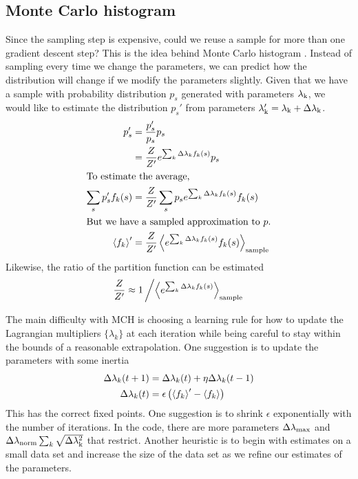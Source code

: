 \documentclass[aps,prl,twocolumn]{revtex4-1}
\begin{document}
\subsection{Monte Carlo histogram}
Since the sampling step is expensive, could we reuse a sample for more than one gradient descent step? This is the idea behind Monte Carlo histogram \cite{Broderick:2007wq}. Instead of sampling every time we change the parameters, we can predict how the distribution will change if we modify the parameters slightly. Given that we have a sample with probability distribution $p_s$ generated with parameters $\lambda_{\rm k}$, we would like to estimate the distribution $p_s'$ from parameters $\lambda_{\rm k}' = \lambda_{\rm k}+\Delta\lambda_{\rm k}$.
\begin{align}
	p_s' &= \frac{p'_s}{p_s}p_s\\
		&= \frac{Z}{Z'}e^{\sum_k \Delta\lambda_k f_k(s)} p_s\\
\intertext{To estimate the average,}
	\sum_s p_s' f_k(s) &= \frac{Z}{Z'} \sum_s p_s e^{\sum_k \Delta\lambda_k f_k(s)} f_k(s)\\
\intertext{But we have a sampled approximation to $p$.}
	\left<f_k\right>' &= \frac{Z}{Z'} \left<e^{\sum_k \Delta\lambda_k f_k(s)} f_k(s)\right>_{\rm sample}
\end{align}
Likewise, the ratio of the partition function can be estimated
\begin{align}
	\frac{Z}{Z'} \approx 1\left/\left<e^{\sum_k \Delta\lambda_k f_k(s)}\right>_{\rm sample}\right.
\end{align}

The main difficulty with MCH is choosing a learning rule for how to update the Lagrangian multipliers $\{\lambda_k\}$ at each iteration while being careful to stay within the bounds of a reasonable extrapolation. One suggestion is to update the parameters with some inertia
\begin{align}
	\Delta\lambda_k(t+1) &= \Delta \lambda_k(t) + \eta \Delta\lambda_k(t-1)\\
	\Delta \lambda_k(t) &= \epsilon\left(\left<f_k\right>'-\left<f_k\right>\right)
\end{align}
This has the correct fixed points. One suggestion is to shrink $\epsilon$ exponentially with the number of iterations. In the code, there are more parameters $\Delta\lambda_{\rm max}$ and $\Delta\lambda_{\rm norm}\sum_k \sqrt{\Delta\lambda_{\rm k}^2}$ that restrict. Another heuristic is to begin with estimates on a small data set and increase the size of the data set as we refine our estimates of the parameters.
\end{document}
